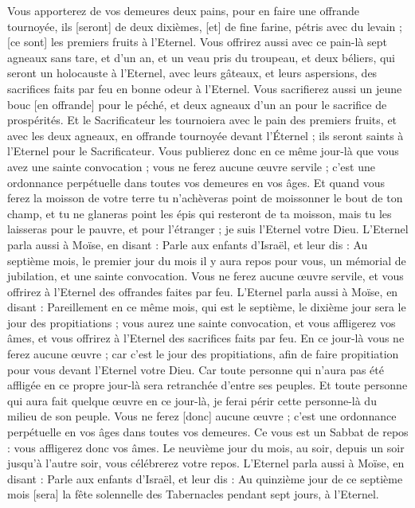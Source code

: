 \begin{multicols}{2}
Vous apporterez de vos demeures deux pains, pour en faire une offrande tournoyée, ils [seront] de deux dixièmes, [et] de fine farine, pétris avec du levain ; [ce sont] les premiers fruits à l'Eternel.
Vous offrirez aussi avec ce pain-là sept agneaux sans tare, et d'un an, et un veau pris du troupeau, et deux béliers, qui seront un holocauste à l'Eternel, avec leurs gâteaux, et leurs aspersions, des sacrifices faits par feu en bonne odeur à l'Eternel.
Vous sacrifierez aussi un jeune bouc [en offrande] pour le péché, et deux agneaux d'un an pour le sacrifice de prospérités.
Et le Sacrificateur les tournoiera avec le pain des premiers fruits, et avec les deux agneaux, en offrande tournoyée devant l'Éternel ; ils seront saints à l'Eternel pour le Sacrificateur.
Vous publierez donc en ce même jour-là que vous avez une sainte convocation ; vous ne ferez aucune œuvre servile ; c'est une ordonnance perpétuelle dans toutes vos demeures en vos âges.
Et quand vous ferez la moisson de votre terre tu n'achèveras point de moissonner le bout de ton champ, et tu ne glaneras point les épis qui resteront de ta moisson, mais tu les laisseras pour le pauvre, et pour l'étranger ; je suis l'Eternel votre Dieu.
L'Eternel parla aussi à Moïse, en disant :
Parle aux enfants d'Israël, et leur dis : Au septième mois, le premier jour du mois il y aura repos pour vous, un mémorial de jubilation, et une sainte convocation.
Vous ne ferez aucune œuvre servile, et vous offrirez à l'Eternel des offrandes faites par feu.
L'Eternel parla aussi à Moïse, en disant :
Pareillement en ce même mois, qui est le septième, le dixième jour sera le jour des propitiations ; vous aurez une sainte convocation, et vous affligerez vos âmes, et vous offrirez à l'Eternel des sacrifices faits par feu.
En ce jour-là vous ne ferez aucune œuvre ; car c'est le jour des propitiations, afin de faire propitiation pour vous devant l'Eternel votre Dieu.
Car toute personne qui n'aura pas été affligée en ce propre jour-là sera retranchée d'entre ses peuples.
Et toute personne qui aura fait quelque œuvre en ce jour-là, je ferai périr cette personne-là du milieu de son peuple.
Vous ne ferez [donc] aucune œuvre ; c'est une ordonnance perpétuelle en vos âges dans toutes vos demeures.
Ce vous est un Sabbat de repos : vous affligerez donc vos âmes. Le neuvième jour du mois, au soir, depuis un soir jusqu'à l'autre soir, vous célébrerez votre repos.
L'Eternel parla aussi à Moïse, en disant :
Parle aux enfants d'Israël, et leur dis : Au quinzième jour de ce septième mois [sera] la fête solennelle des Tabernacles pendant sept jours, à l'Eternel.

\end{multicols}
